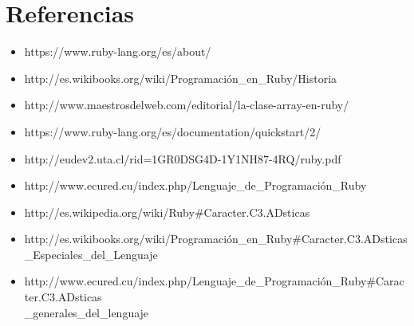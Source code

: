 \documentclass[11pt]{article} %
\begin{document}
\section{\bf Referencias}
\begin{itemize}
          \item  https://www.ruby-lang.org/es/about/ \\
          \item http://es.wikibooks.org/wiki/Programación\_en\_Ruby/Historia\\
	\item http://www.maestrosdelweb.com/editorial/la-clase-array-en-ruby/\\
	\item https://www.ruby-lang.org/es/documentation/quickstart/2/\\
	\item http://eudev2.uta.cl/rid=1GR0DSG4D-1Y1NH87-4RQ/ruby.pdf\\
	\item http://www.ecured.cu/index.php/Lenguaje\_de\_Programación\_Ruby\\
	\item http://es.wikipedia.org/wiki/Ruby\#Caracter.C3.ADsticas \\
	\item  http://es.wikibooks.org/wiki/Programación\_en\_Ruby\#Caracter.C3.ADsticas\\
\_Especiales\_del\_Lenguaje \\
	 \item http://www.ecured.cu/index.php/Lenguaje\_de\_Programación\_Ruby\#Caracter.C3.ADsticas\\
\_generales\_del\_lenguaje \\

\end{itemize}
\end{document}
